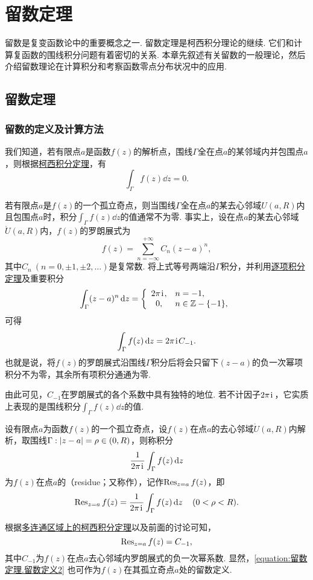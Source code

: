 \chapter{留数定理}
留数是复变函数论中的重要概念之一.
留数定理是柯西积分理论的继续.
它们和计算复函数的围线积分问题有着密切的关系.
本章先叙述有关留数的一般理论，然后介绍留数理论在计算积分和考察函数零点分布状况中的应用.

\section{留数定理}
\subsection{留数的定义及计算方法}
我们知道，若有限点\(a\)是函数\(f(z)\)的解析点，围线\(\Gamma\)全在点\(a\)的某邻域内并包围点\(a\)，则根据\hyperref[theorem:解析函数的积分表示.柯西积分定理]{柯西积分定理}，有\[
\int_\Gamma f(z) \dd{z} = 0.
\]

若有限点\(a\)是\(f(z)\)的一个孤立奇点，则当围线\(\Gamma\)全在点\(a\)的某去心邻域\(U(a,R)\)内且包围点\(a\)时，积分\(\int_\Gamma f(z) \dd{z}\)的值通常不为零.
事实上，设在点\(a\)的某去心邻域\(\mathring{U}(a,R)\)内，\(f(z)\)的罗朗展式为\[
f(z) = \sum\limits_{n=-\infty}^{+\infty} C_n (z-a)^n,
\]其中\(C_n\ (n=0,\pm1,\pm2,\dotsc)\)是复常数.
将上式等号两端沿\(\Gamma\)积分，并利用\hyperref[theorem:解析函数的级数表示.一致收敛级数的基本性质2]{逐项积分定理}及重要积分  \[
\int_\Gamma (z-a)^n \dd{z} = \left\{ \begin{array}{cl}
2\pi\kern1pt\mathrm{i}\kern1pt, & n=-1, \\
0,& n\in\mathbb{Z}-\{-1\},
\end{array} \right.
\]可得\[
\int_\Gamma f(z) \dd{z} = 2\pi\kern1pt\mathrm{i}\kern1pt C_{-1}.
\]也就是说，将\(f(z)\)的罗朗展式沿围线\(\Gamma\)积分后将会只留下\((z-a)\)的负一次幂项积分不为零，其余所有项积分通通为零.

由此可见，\(C_{-1}\)在罗朗展式的各个系数中具有独特的地位.
若不计因子\(2\pi\kern1pt\mathrm{i}\kern1pt\)，它实质上表现的是围线积分\(\int_\Gamma f(z) \dd{z}\)的值.

\begin{definition}
设有限点\(a\)为函数\(f(z)\)的一个孤立奇点，设\(f(z)\)在点\(a\)的去心邻域\(\mathring{U}(a,R)\)内解析，取围线\(\Gamma: \abs{z-a}=\rho\in(0,R)\)，则称积分\[
\frac{1}{2\pi\kern1pt\mathrm{i}\kern1pt} \int_\Gamma f(z) \dd{z}
\]为\(f(z)\)在点\(a\)的（residue；又称作），记作\(\operatorname{Res}_{z=a} f(z)\)，即\begin{equation}\label{equation:留数定理.留数定义1}
\operatorname{Res}_{z=a} f(z)
= \frac{1}{2\pi\kern1pt\mathrm{i}\kern1pt} \int_\Gamma f(z) \dd{z}
\quad(0<\rho<R).
\end{equation}
\end{definition}
根据\hyperref[theorem:解析函数的积分表示.多连通区域的柯西积分定理]{多连通区域上的柯西积分定理}以及前面的讨论可知，\begin{equation}\label{equation:留数定理.留数定义2}
\operatorname{Res}_{z=a} f(z) = C_{-1},
\end{equation}
其中\(C_{-1}\)为\(f(z)\)在点\(a\)去心邻域内罗朗展式的负一次幂系数.
显然，\cref{equation:留数定理.留数定义2} 也可作为\(f(z)\)在其孤立奇点\(a\)处的留数定义.

